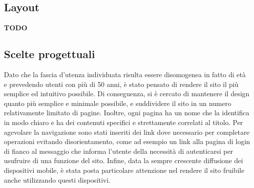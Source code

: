 \subsection{Layout}
\textbf{TODO}

\subsection{Scelte progettuali}
Dato che la fascia d'utenza individuata risulta essere disomogenea in fatto di età e prevedendo utenti con più di 50 anni, è stato pensato di rendere il sito il più semplice ed intuitivo possibile. Di conseguenza, si è cercato di mantenere il design quanto più semplice e minimale possibile, e suddividere il sito in un numero relativamente limitato di pagine. Inoltre, ogni pagina ha un nome che la identifica in modo chiaro e ha dei contenuti specifici e strettamente correlati al titolo. Per agevolare la navigazione sono stati inseriti dei link dove necessario per completare operazioni evitando disorientamento, come ad esempio un link alla pagina di login di fianco al messaggio che informa l'utente della necessità di autenticarsi per usufruire di una funzione del sito. \newline
Infine, data la sempre crescente diffusione dei dispositivi mobile, è stata posta particolare attenzione nel rendere il sito fruibile anche utilizzando questi dispositivi. 
	